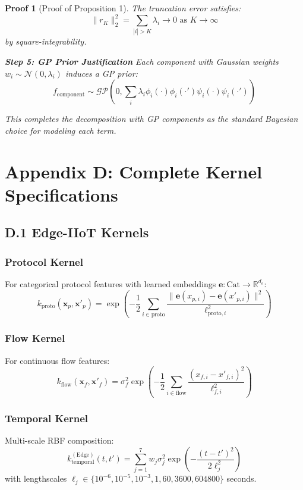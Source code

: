 \documentclass[12pt]{article}
\newcommand{\R}{\mathbb{R}}
\newcommand{\N}{\mathcal{N}}
\newtheorem{proof_sketch}{Proof}
\begin{document}
\begin{proof_sketch}[Proof of Proposition 1]
The truncation error satisfies:
\begin{equation}
\|r_K\|_2^2 = \sum_{|i|>K} \lambda_i \to 0 \text{ as } K \to \infty
\end{equation}
by square-integrability.

\textbf{Step 5: GP Prior Justification}
Each component with Gaussian weights $w_i \sim \N(0, \lambda_i)$ induces a GP prior:
\begin{equation}
f_{\text{component}} \sim \mathcal{GP}\left(0, \sum_{i} \lambda_i \phi_i(\cdot)\phi_i(\cdot')\psi_i(\cdot)\psi_i(\cdot')\right)
\end{equation}

This completes the decomposition with GP components as the standard Bayesian choice for modeling each term.
\end{proof_sketch}

\section{Appendix D: Complete Kernel Specifications}

\subsection{D.1 Edge-IIoT Kernels}

\subsubsection{Protocol Kernel}
For categorical protocol features with learned embeddings $\mathbf{e}: \text{Cat} \to \R^{d_e}$:
\begin{equation}
k_{\text{proto}}(\mathbf{x}_p, \mathbf{x'}_p) = \exp\left(-\frac{1}{2}\sum_{i \in \text{proto}} \frac{\|\mathbf{e}(x_{p,i}) - \mathbf{e}(x'_{p,i})\|^2}{\ell_{\text{proto},i}^2}\right)
\end{equation}

\subsubsection{Flow Kernel}
For continuous flow features:
\begin{equation}
k_{\text{flow}}(\mathbf{x}_f, \mathbf{x'}_f) = \sigma_f^2 \exp\left(-\frac{1}{2}\sum_{i \in \text{flow}} \frac{(x_{f,i} - x'_{f,i})^2}{\ell_{f,i}^2}\right)
\end{equation}

\subsubsection{Temporal Kernel}
Multi-scale RBF composition:
\begin{equation}
k_{\text{temporal}}^{(\text{Edge})}(t, t') = \sum_{j=1}^7 w_j \sigma_j^2 \exp\left(-\frac{(t-t')^2}{2\ell_j^2}\right)
\end{equation}
with lengthscales $\ell_j \in \{10^{-6}, 10^{-5}, 10^{-3}, 1, 60, 3600, 604800\}$ seconds.
\end{document}

